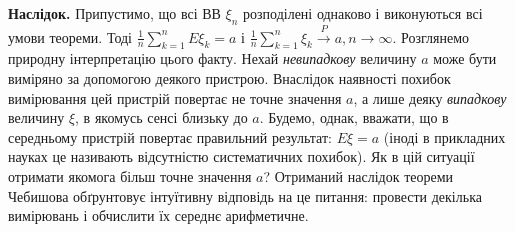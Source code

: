 \noindent\textbf{Наслідок.}
    Припустимо, що всі ВВ $\xi_n$ розподілені однаково і виконуються всі умови теореми. Тоді 
    $\frac{1}{n}\sum\limits_{k=1}^n E\xi_k = a$ і $\frac{1}{n}\sum\limits_{k=1}^n \xi_k 
    \overset{P}{\longrightarrow} a, n\to\infty$. Розглянемо природну інтерпретацію цього факту.
    Нехай \emph{невипадкову} величину $a$ може бути виміряно за допомогою деякого пристрою. 
    Внаслідок наявності похибок вимірювання цей пристрій повертає не точне значення $a$, 
    а лише деяку \emph{випадкову} величину $\xi$, в якомусь сенсі близьку до $a$. 
    Будемо, однак, вважати, що в середньому пристрій повертає правильний результат: 
    $E\xi=a$ (іноді в прикладних науках це називають відсутністю систематичних похибок). 
    Як в цій ситуації отримати якомога більш точне значення $a$? Отриманий наслідок теореми Чебишова обґрунтовує
    інтуїтивну відповідь на це питання: провести декілька вимірювань і обчислити їх середнє арифметичне.

